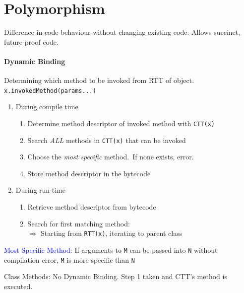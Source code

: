 \section{Polymorphism}
Difference in code behaviour without changing existing code. Allows succinct,
future-proof code.
\paragraph{Dynamic Binding}
Determining which method to be invoked from RTT of object.
\verb|x.invokedMethod(params...)|
\begin{enumerate}
  \item During compile time
    \begin{enumerate}
      \item Determine method descriptor of invoked method with \verb|CTT(x)|
      \item Search \emph{ALL} methods in \verb|CTT(x)| that can be invoked
    \item Choose the \emph{most specific} method.\ \textcolor{Bittersweet}{If none exists, error.}
      \item Store method descriptor in the bytecode
    \end{enumerate}
  \item During run-time
    \begin{enumerate}
      \item Retrieve method descriptor from bytecode
      \item Search for first matching method:\\
        $\Rightarrow$ Starting from \verb|RTT(x)|, iterating to parent class
    \end{enumerate}
\end{enumerate}
\textcolor{Blue}{Most Specific Method}: If arguments to \verb|M| can be passed
into \verb|N| without compilation error, \verb|M| is more specific than
\verb|N|

\textcolor{Bittersweet}{Class Methods}: No Dynamic Binding. Step 1 taken and
CTT's method is executed.
